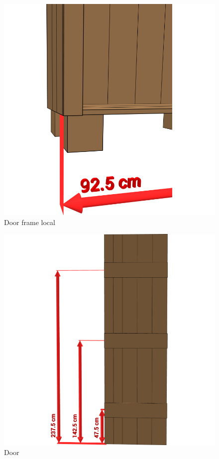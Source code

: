 \documentclass{article}
\begin{document}
\begin{figure}[h!]
    \centering
    \includegraphics[width=\textwidth]{scene 10 - deurpost b.png}
    \caption{Door frame local}
\end{figure}

\begin{figure}[h!]
    \centering
    \includegraphics[width=\textwidth]{scene 11 - deur.png}
    \caption{Door}
\end{figure}
\end{document}
